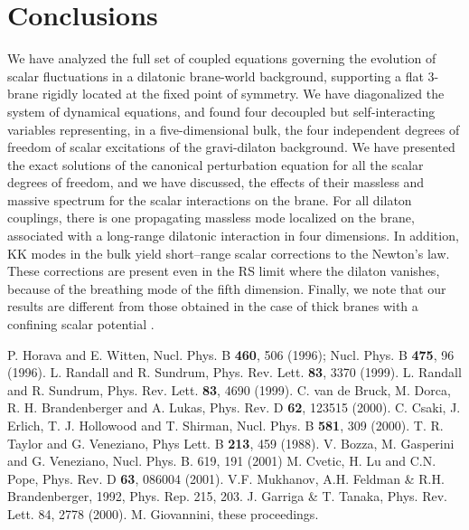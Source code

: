 \documentclass[a4paper,12pt]{article}
\begin{document}
\section{Conclusions}
We have analyzed the full set of coupled equations governing the
evolution of scalar fluctuations in a dilatonic brane-world
background, supporting a flat 3-brane rigidly located at the fixed
point of \coordHE{} symmetry. We have diagonalized the system of
dynamical equations, and found four decoupled but self-interacting
variables representing, in a five-dimensional bulk, the four
independent degrees of freedom of scalar excitations of the
gravi-dilaton background.
We have presented the exact solutions of the canonical
perturbation equation for all the scalar degrees of freedom, and
we have discussed, the effects of their massless and massive
spectrum for the scalar interactions on the brane.
For all dilaton couplings, there is  one propagating massless mode
localized on the brane,  associated with a long-range dilatonic
interaction in four dimensions. In addition, KK modes in the bulk
yield short--range scalar corrections to the Newton's law. These
corrections are present even in the RS limit where the dilaton
vanishes, because of the breathing mode of the fifth dimension.
Finally, we note that our results are different from those
obtained in the case of thick branes with a confining scalar
potential \cite{Giovannini}.
\begin{thebibliography}{99}
P. Horava and E. Witten, Nucl. Phys. B {\bf 460}, 506
(1996); Nucl. Phys. B {\bf 475}, 96 (1996).
 L. Randall and R. Sundrum,  Phys. Rev. Lett. {\bf 83}, 3370 (1999).
 L. Randall and R. Sundrum,  Phys. Rev. Lett. {\bf 83},
4690  (1999).
 C. van de Bruck, M. Dorca, R. H. Brandenberger and A.
Lukas, Phys. Rev. D  {\bf 62}, 123515 (2000).
 C. Csaki, J. Erlich, T. J. Hollowood and T. Shirman, Nucl.
Phys. B {\bf 581}, 309 (2000).
 T. R. Taylor and G. Veneziano, Phys Lett. B {\bf 213}, 459
(1988).
 V. Bozza, M. Gasperini and G. Veneziano,
Nucl. Phys. B. 619, 191 (2001)
 M. Cvetic, H. Lu and C.N. Pope,
Phys. Rev. D {\bf 63}, 086004 (2001).
 V.F. Mukhanov, A.H. Feldman \& R.H. Brandenberger,
1992, Phys. Rep. 215, 203.
 J. Garriga \& T. Tanaka, Phys. Rev. Lett. 84,
2778 (2000).
 M. Giovannini, these proceedings.
\end{thebibliography}
\end{document}
